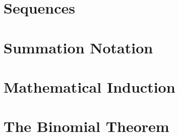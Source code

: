 \section{Sequences}



\newpage

\section{Summation Notation}



\newpage

\section{Mathematical Induction}



\newpage

\section{The Binomial Theorem}



\newpage

